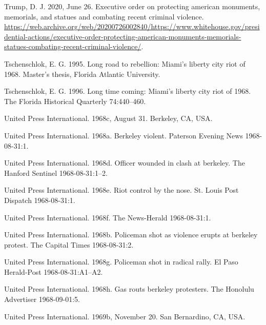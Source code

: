 \documentclass[
  11pt,
]{krantz}
\newlength{\cslhangindent}
\newlength{\cslentryspacingunit} %
\newenvironment{CSLReferences}[2] %
 {%
  \setlength{\parindent}{0pt}
  \ifodd #1
  \let\oldpar\par
  \def\par{\hangindent=\cslhangindent\oldpar}
  \fi
  \setlength{\parskip}{#2\cslentryspacingunit}
 }%
 {}
\begin{document}
\begin{CSLReferences}{1}{0}
\leavevmode{}%
Trump, D. J. 2020, June 26. Executive order on protecting american monuments, memorials, and statues and combating recent criminal violence. \url{https://web.archive.org/web/20200726002840/https://www.whitehouse.gov/presidential-actions/executive-order-protecting-american-monuments-memorials-statues-combating-recent-criminal-violence/}.

\leavevmode{}%
Tschenschlok, E. G. 1995. Long road to rebellion: Miami's liberty city riot of 1968. Master's thesis, Florida Atlantic University.

\leavevmode{}%
Tschenschlok, E. G. 1996. Long time coming: Miami's liberty city riot of 1968. The Florida Historical Quarterly 74:440--460.

\leavevmode{}%
United Press International. 1968c, August 31. Berkeley, CA, USA.

\leavevmode{}%
United Press International. 1968a. Berkeley violent. Paterson Evening News 1968-08-31:1.

\leavevmode{}%
United Press International. 1968d. Officer wounded in clash at berkeley. The Hanford Sentinel 1968-08-31:1--2.

\leavevmode{}%
United Press International. 1968e. Riot control by the nose. St. Louis Post Dispatch 1968-08-31:1.

\leavevmode{}%
United Press International. 1968f. The News-Herald 1968-08-31:1.

\leavevmode{}%
United Press International. 1968b. Policeman shot as violence erupts at berkeley protest. The Capital Times 1968-08-31:2.

\leavevmode{}%
United Press International. 1968g. Policeman shot in radical rally. El Paso Herald-Post 1968-08-31:A1--A2.

\leavevmode{}%
United Press International. 1968h. Gas routs berkeley protesters. The Honolulu Advertiser 1968-09-01:5.

\leavevmode{}%
United Press International. 1969b, November 20. San Bernardino, CA, USA.


\end{CSLReferences}
\end{document}
